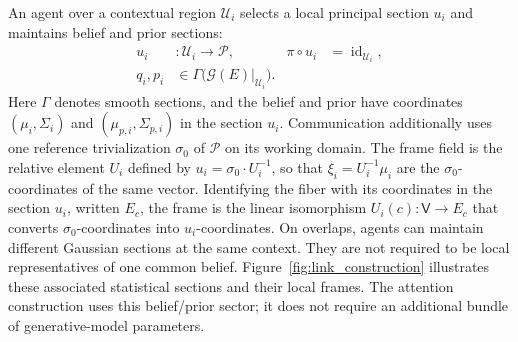 \documentclass[twoside,11pt]{article}
\begin{document}
An agent over a contextual region \(\mathcal U_i\) selects a local principal section \(u_i\) and maintains belief and prior sections:
\begin{equation}
\begin{aligned}
u_i&:\mathcal U_i\longrightarrow\mathcal P,
&\pi\circ u_i&=\operatorname{id}_{\mathcal U_i},\\
q_i,p_i&\in\Gamma\bigl(\mathcal G(E)|_{\mathcal U_i}\bigr).
\end{aligned}
\label{eq:agent_bundle_sections}
\end{equation}
Here \(\Gamma\) denotes smooth sections, and the belief and prior have coordinates \((\mu_i,\Sigma_i)\) and \((\mu_{p,i},\Sigma_{p,i})\) in the section \(u_i\). Communication additionally uses one reference trivialization \(\sigma_0\) of \(\mathcal P\) on its working domain. The frame field is the relative element \(U_i\) defined by \(u_i=\sigma_0\cdot U_i^{-1}\), so that \(\xi_i=U_i^{-1}\mu_i\) are the \(\sigma_0\)-coordinates of the same vector. Identifying the fiber with its coordinates in the section \(u_i\), written \(E_c\), the frame is the linear isomorphism \(U_i(c):\mathsf V\to E_c\) that converts \(\sigma_0\)-coordinates into \(u_i\)-coordinates. On overlaps, agents can maintain different Gaussian sections at the same context. They are not required to be local representatives of one common belief. Figure~\ref{fig:link_construction} illustrates these associated statistical sections and their local frames. The attention construction uses this belief/prior sector; it does not require an additional bundle of generative-model parameters.
\end{document}
